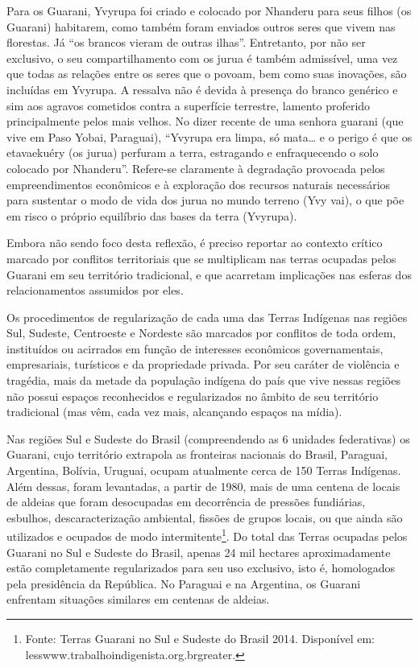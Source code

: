 Para os Guarani, Yvyrupa foi criado e colocado por Nhanderu para seus
filhos (os Guarani) habitarem, como também foram enviados outros seres
que vivem nas florestas. Já ``os brancos vieram de outras ilhas''.
Entretanto, por não ser exclusivo, o seu compartilhamento com os jurua
é também admissível, uma vez que todas as relações entre os seres que o
povoam, bem como suas inovações, são incluídas em Yvyrupa. A ressalva
não é devida à presença do branco genérico e sim aos agravos cometidos
contra a superfície terrestre, lamento proferido principalmente pelos
mais velhos. No dizer recente de uma senhora guarani (que vive em Paso
Yobai, Paraguai), ``Yvyrupa era limpa, só mata\ldots{} e o perigo é que os
etavaekuéry (os jurua) perfuram a terra, estragando e enfraquecendo o
solo colocado por Nhanderu''. Refere-se claramente à degradação
provocada pelos empreendimentos econômicos e à exploração dos recursos
naturais necessários para sustentar o modo de vida dos jurua no mundo
terreno (Yvy vai), o que põe em risco o próprio equilíbrio das bases da
terra (Yvyrupa). 

Embora não sendo foco desta reflexão, é preciso reportar ao contexto
crítico marcado por conflitos territoriais que se multiplicam nas
terras ocupadas pelos Guarani em seu território tradicional, e que
acarretam implicações nas esferas dos relacionamentos assumidos por
eles. 

Os procedimentos de regularização de cada uma das Terras Indígenas nas
regiões Sul, Sudeste, Centroeste e Nordeste são marcados por conflitos
de toda ordem, instituídos ou acirrados em função de interesses
econômicos governamentais, empresariais, turísticos e da propriedade
privada. Por seu caráter de violência e tragédia, mais da metade da
população indígena do país que vive nessas regiões não possui espaços
reconhecidos e regularizados no âmbito de seu território tradicional
(mas vêm, cada vez mais, alcançando espaços na mídia). 

Nas regiões Sul e Sudeste do Brasil (compreendendo as 6 unidades
federativas) os Guarani, cujo território extrapola as fronteiras
nacionais do Brasil, Paraguai, Argentina, Bolívia, Uruguai, ocupam
atualmente cerca de 150 Terras Indígenas. Além dessas, foram
levantadas, a partir de 1980, mais de uma centena de locais de aldeias
que foram desocupadas em decorrência de pressões fundiárias, esbulhos,
descaracterização ambiental, fissões de grupos locais, ou que ainda são
utilizados e ocupados de modo intermitente\footnote{Fonte: Terras
Guarani no Sul e Sudeste do Brasil 2014. Disponível em:
{less}www.trabalhoindigenista.org.br{greater}.}. Do total das
Terras ocupadas pelos Guarani no Sul e Sudeste do Brasil, apenas 24 mil
hectares aproximadamente estão completamente regularizados para seu uso
exclusivo, isto é, homologados pela presidência da República. No
Paraguai e na Argentina, os Guarani enfrentam situações similares em
centenas de aldeias. 

